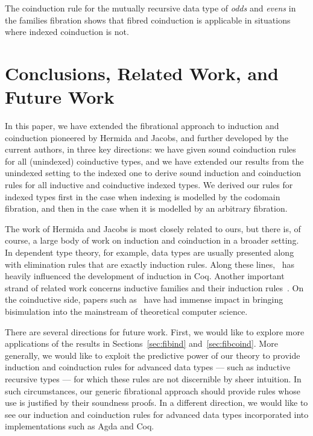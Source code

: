 \documentclass{LMCS}
\theoremstyle{plain}
\theoremstyle{remark}
\theoremstyle{definition}
\begin{document}
The coinduction rule for the mutually recursive data type of {\em
  odds} and {\em evens} in the families fibration shows that fibred
coinduction is applicable in situations where indexed coinduction is
not.

\section{Conclusions, Related Work, and Future Work}\label{sec:conc} 

In this paper, we have extended the fibrational approach to induction
and coinduction pioneered by Hermida and Jacobs, and further developed
by the current authors, in three key directions: we have given sound
coinduction rules for all (unindexed) coinductive types, and we have
extended our results from the unindexed setting to the indexed one to
derive sound induction and coinduction rules for all inductive and
coinductive indexed types. We derived our rules for indexed types
first in the case when indexing is modelled by the codomain fibration,
and then in the case when it is modelled by an arbitrary fibration.

The work of Hermida and Jacobs is most closely related to ours, but
there is, of course, a large body of work on induction and coinduction
in a broader setting. In dependent type theory, for example, data
types are usually presented along with elimination rules that are
exactly induction rules. Along these lines,~\cite{pm89} has heavily
influenced the development of induction in Coq. Another important
strand of related work concerns inductive families and their induction
rules~\cite{dyb94}. On the coinductive side, papers such
as~\cite{am89,rut00,tr98} have had immense impact in bringing
bisimulation into the mainstream of theoretical computer science.

There are several directions for future work. First, we would like to
explore more applications of the results in Sections~\ref{sec:fibind}
and~\ref{sec:fibcoind}.  More generally, we would like to exploit the
predictive power of our theory to provide induction and coinduction
rules for advanced data types --- such as inductive recursive types
--- for which these rules are not discernible by sheer intuition. In
such circumstances, our generic fibrational approach should provide
rules whose use is justified by their soundness proofs. In a different
direction, we would like to see our induction and coinduction rules
for advanced data types incorporated into implementations such as Agda
and Coq.
\end{document}
